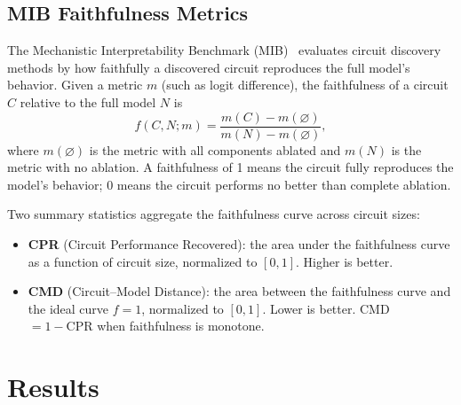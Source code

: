 \documentclass{article}
\begin{document}
\subsection{MIB Faithfulness Metrics}
\label{sec:mib-metrics}

The Mechanistic Interpretability Benchmark
(MIB)~\citep{mueller2025mib} evaluates circuit discovery methods by how
faithfully a discovered circuit reproduces the full model's behavior.
Given a metric $m$ (such as logit difference), the faithfulness of a
circuit $C$ relative to the full model $N$ is
\begin{equation}
  f(C, N; m) = \frac{m(C) - m(\varnothing)}{m(N) - m(\varnothing)},
  \label{eq:faithfulness}
\end{equation}
where $m(\varnothing)$ is the metric with all components ablated and
$m(N)$ is the metric with no ablation. A faithfulness of 1 means the
circuit fully reproduces the model's behavior; 0 means the circuit
performs no better than complete ablation.

Two summary statistics aggregate the faithfulness curve across circuit
sizes:

\begin{itemize}
\item \textbf{CPR} (Circuit Performance Recovered): the area under the
  faithfulness curve as a function of circuit size, normalized to $[0,1]$.
  Higher is better.

\item \textbf{CMD} (Circuit--Model Distance): the area between the
  faithfulness curve and the ideal curve $f = 1$, normalized to $[0,1]$.
  Lower is better. CMD $= 1 - \text{CPR}$ when faithfulness is monotone.
\end{itemize}


\section{Results}
\label{sec:results}


%
%
\end{document}
